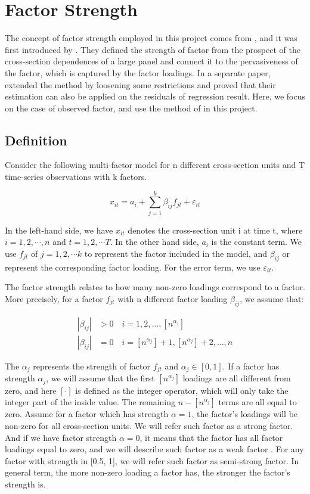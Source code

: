 \chapter{Factor Strength}\label{strength}
The concept of factor strength employed in this project comes from , and it was first introduced by .
They defined the strength of factor from the prospect of the cross-section dependences of a large panel and connect it to the pervasiveness of the factor, which is captured by the factor loadings.
In a separate paper,  extended the method by loosening some restrictions and proved that their estimation can also be applied on the residuals of regression result.
Here, we focus on the case of observed factor, and use the method of  in this project.

\section{Definition}\label{strength_definiton}

Consider the following multi-factor model for n different cross-section units and T time-series observations with k  factors.

\[  x_{it} = a_{i}+  \sum_{j=1}^{k}\beta_{ij}f_{jt} + \varepsilon_{it} \tag{1}\label{definition_model} \]

In the left-hand side, we have $x_{it}$ denotes the cross-section unit i at time t, where $i = 1, 2, \cdots, n$ and $t = 1,2, \cdots T$.  
In the other hand side, $a_{i}$ is the constant term.
We use $f_{jt}$ of $j = 1, 2, \cdots k$ to represent the factor included in the model, and $\beta_{ij}$ or represent the corresponding factor loading.
For the error term, we use $\varepsilon_{it}$.

The factor strength relates to how many non-zero loadings correspond to a factor.
More precisely, for a factor $f_{jt}$ with n different factor loading $\beta_{ij}$, we assume that:

\begin{align*}
|\beta_{ij}| &> 0\quad i = 1, 2,  \dots, [n^{\alpha_j}]\\
|\beta_{ij}| &= 0 \quad i = [n^{\alpha_j}] + 1, [n^{\alpha_j}] +2 ,\dots, n
\end{align*}

The $\alpha_j$ represents the strength of factor $f_{jt}$ and $\alpha_j \in [0,1]$.
If a factor has strength $\alpha_j$, we will assume that the first $[n^{\alpha_j}]$ loadings are all different from zero, and here $[\cdot] $  is defined as the integer operator, which will only take the integer part of the inside value.
The remaining $n - [n^{\alpha_j}]$ terms are all equal to zero. 
Assume for a factor which has strength $\alpha = 1$, the factor's loadings will be non-zero for all cross-section units.
We will refer such factor as a strong factor.
And if we have factor strength $\alpha = 0$, it means that the factor has all factor loadings equal to zero, and we will describe such factor as a weak factor \cite{Bailey2016}.
For any factor with strength in [0.5, 1], we will refer such factor as semi-strong factor.
In general term, the more non-zero loading a factor has, the stronger the factor's strength is. 

